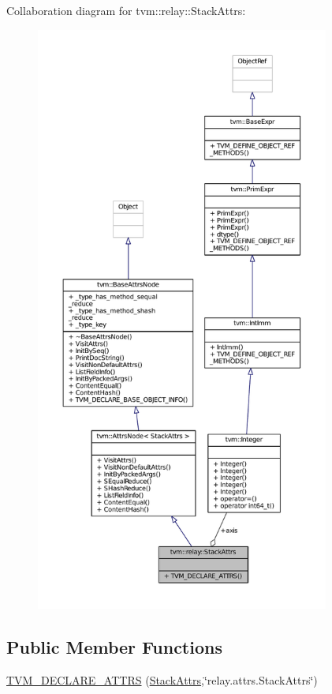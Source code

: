 Collaboration diagram for tvm\+:\+:relay\+:\+:Stack\+Attrs\+:
\nopagebreak
\begin{figure}[H]
\begin{center}
\leavevmode
\includegraphics[height=550pt]{structtvm_1_1relay_1_1StackAttrs__coll__graph}
\end{center}
\end{figure}
\subsection*{Public Member Functions}
\begin{DoxyCompactItemize}
\item 
\hyperlink{structtvm_1_1relay_1_1StackAttrs_a5200ebdce837b988b49b03d062c987d3}{T\+V\+M\+\_\+\+D\+E\+C\+L\+A\+R\+E\+\_\+\+A\+T\+T\+RS} (\hyperlink{structtvm_1_1relay_1_1StackAttrs}{Stack\+Attrs},\char`\"{}relay.\+attrs.\+Stack\+Attrs\char`\"{})
\end{DoxyCompactItemize}
